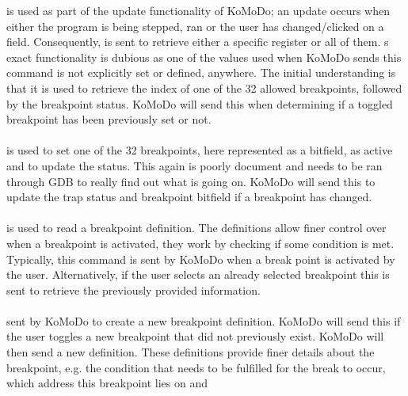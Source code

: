 %
 is used as part of the update functionality of KoMoDo; an update occurs when either the program is being stepped, ran or the user has changed/clicked on a field. Consequently,  is sent to retrieve either a specific register or all of them.
%
%
%
%
s exact functionality is dubious as one of the values used when KoMoDo sends this command is not explicitly set or defined, anywhere. The initial understanding is that it is used to retrieve the index of one of the 32 allowed breakpoints, followed by the breakpoint status. KoMoDo will send this when determining if a toggled breakpoint has been previously set or not.\\\\
%
 is used to set one of the 32 breakpoints, here represented as a bitfield, as active and to update the status. This again is poorly document and needs to be ran through GDB to really find out what is going on. KoMoDo will send this to update the trap status and breakpoint bitfield if a breakpoint has changed.\\\\
%
 is used to read a breakpoint definition. The definitions allow finer control over when a breakpoint is activated, they work by checking if some condition is met. Typically, this command is sent by KoMoDo when a break point is activated by the user. Alternatively, if the user selects an already selected breakpoint this is sent to retrieve the previously provided information.\\\\
%
 sent by KoMoDo to create a new breakpoint definition. KoMoDo will send this if the user toggles a new breakpoint that did not previously exist. KoMoDo will then send a new definition. These definitions  provide finer details about the breakpoint, e.g. the condition that needs to be fulfilled for the break to occur, which address this breakpoint lies on and
